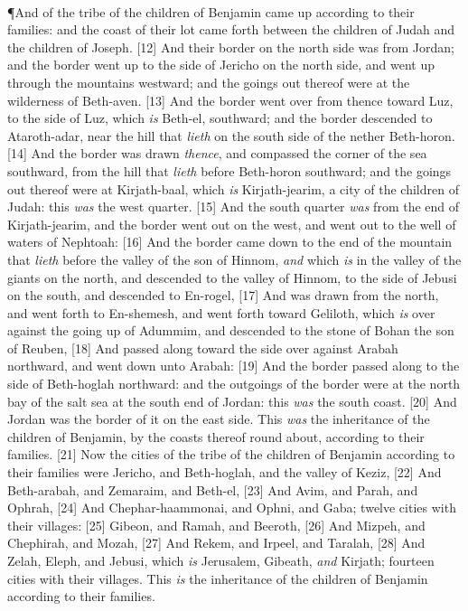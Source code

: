 \\
\P \textcolor[cmyk]{0.99998,1,0,0}{And  of the tribe of the children of Benjamin came up according to their families: and the coast of their lot came forth between the children of Judah and the children of Joseph.}
[12] \textcolor[cmyk]{0.99998,1,0,0}{And their border on the north side was from Jordan; and the border went up to the side of Jericho on the north side, and went up through the mountains westward; and the goings out thereof were at the wilderness of Beth-aven.}
[13] \textcolor[cmyk]{0.99998,1,0,0}{And the border went over from thence toward Luz, to the side of Luz, which \emph{is} Beth-el, southward; and the border descended to Ataroth-adar, near the hill that \emph{lieth} on the south side of the nether Beth-horon.}
[14] \textcolor[cmyk]{0.99998,1,0,0}{And the border was drawn \emph{thence}, and compassed the corner of the sea southward, from the hill that \emph{lieth} before Beth-horon southward; and the goings out thereof were at Kirjath-baal, which \emph{is} Kirjath-jearim, a city of the children of Judah: this \emph{was} the west quarter.}
[15] \textcolor[cmyk]{0.99998,1,0,0}{And the south quarter \emph{was} from the end of Kirjath-jearim, and the border went out on the west, and went out to the well of waters of Nephtoah:}
[16] \textcolor[cmyk]{0.99998,1,0,0}{And the border came down to the end of the mountain that \emph{lieth} before the valley of the son of Hinnom, \emph{and} which \emph{is} in the valley of the giants on the north, and descended to the valley of Hinnom, to the side of Jebusi on the south, and descended to En-rogel,}
[17] \textcolor[cmyk]{0.99998,1,0,0}{And was drawn from the north, and went forth to En-shemesh, and went forth toward Geliloth, which \emph{is} over against the going up of Adummim, and descended to the stone of Bohan the son of Reuben,}
[18] \textcolor[cmyk]{0.99998,1,0,0}{And passed along toward the side over against Arabah northward, and went down unto Arabah:}
[19] \textcolor[cmyk]{0.99998,1,0,0}{And the border passed along to the side of Beth-hoglah northward: and the outgoings of the border were at the north bay of the salt sea at the south end of Jordan: this \emph{was} the south coast.}
[20] \textcolor[cmyk]{0.99998,1,0,0}{And Jordan was the border of it on the east side. This \emph{was} the inheritance of the children of Benjamin, by the coasts thereof round about, according to their families.}
[21] \textcolor[cmyk]{0.99998,1,0,0}{Now the cities of the tribe of the children of Benjamin according to their families were Jericho, and Beth-hoglah, and the valley of Keziz,}
[22] \textcolor[cmyk]{0.99998,1,0,0}{And Beth-arabah, and Zemaraim, and Beth-el,}
[23] \textcolor[cmyk]{0.99998,1,0,0}{And Avim, and Parah, and Ophrah,}
[24] \textcolor[cmyk]{0.99998,1,0,0}{And Chephar-haammonai, and Ophni, and Gaba; twelve cities with their villages:}
[25] \textcolor[cmyk]{0.99998,1,0,0}{Gibeon, and Ramah, and Beeroth,}
[26] \textcolor[cmyk]{0.99998,1,0,0}{And Mizpeh, and Chephirah, and Mozah,}
[27] \textcolor[cmyk]{0.99998,1,0,0}{And Rekem, and Irpeel, and Taralah,}
[28] \textcolor[cmyk]{0.99998,1,0,0}{And Zelah, Eleph, and Jebusi, which \emph{is} Jerusalem, Gibeath, \emph{and} Kirjath; fourteen cities with their villages. This \emph{is} the inheritance of the children of Benjamin according to their families.}
